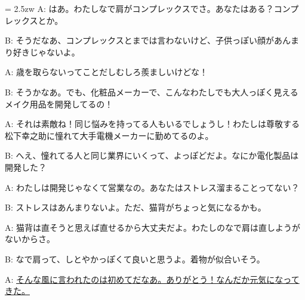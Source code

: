 \documentclass[11pt]{amsart}
\title{}
\author{}
\newenvironment{hangall}[1]{\hangindent = 2.5zw\everypar{\hangindent = 2.5zw}}{}
\begin{document}
\maketitle
\begin{hangall}{}%
A: はあ。わたしなで肩がコンプレックスでさ。あなたはある？コンプレックスとか。

B: そうだなあ、コンプレックスとまでは言わないけど、子供っぽい顔があんまり好きじゃないよ。

A: 歳を取らないってことだしむしろ羨ましいけどな！

B: そうかなあ。でも、化粧品メーカーで、こんなわたしでも大人っぽく見えるメイク用品を開発してるの！

A: それは素敵ね！同じ悩みを持ってる人もいるでしょうし！わたしは尊敬する松下幸之助に憧れて大手電機メーカーに勤めてるのよ。

B: へえ、憧れてる人と同じ業界にいくって、よっぽどだよ。なにか電化製品は開発した？

A: わたしは開発じゃなくて営業なの。あなたはストレス溜まることってない？

B: ストレスはあんまりないよ。ただ、猫背がちょっと気になるかも。

A: 猫背は直そうと思えば直せるから大丈夫だよ。わたしのなで肩は直しようがないからさ。

B: なで肩って、しとやかっぽくて良いと思うよ。着物が似合いそう。

A: \ul{そんな風に言われたのは初めてだなあ。ありがとう！なんだか元気になってきた。}\end{hangall}
\end{document}
